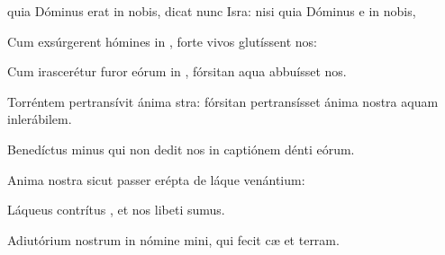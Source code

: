 \item {} quia Dóminus erat in nobis, dicat nunc Isra:\psstar{} nisi quia Dóminus e in nobis,

\item Cum exsúrgerent hómines in ,\psstar{} forte vivos glutíssent nos:

\item Cum irascerétur furor eórum in ,\psstar{} fórsitan aqua abbuísset nos.

\item Torréntem pertransívit ánima stra:\psstar{} fórsitan pertransísset ánima nostra aquam inlerábilem.

\item Benedíctus minus\psstar{} qui non dedit nos in captiónem dénti eórum.

\item Anima nostra sicut passer erépta \psstar{} de láque venántium:

\item Láqueus contrítus ,\psstar{} et nos libeti sumus.

\item Adiutórium nostrum in nómine mini,\psstar{} qui fecit cæ et terram.
